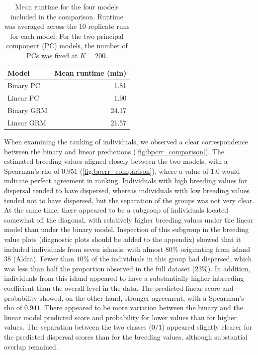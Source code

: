 
\begin{table}[htbp]
  \centering
  \caption{Mean runtime for the four models included in the comparison. Runtime was averaged across the 10
  replicate runs for each model. For the two principal component (PC) models, the number of PCs was fixed at \(K = 200\).}
  \label{tab:runtime_dropisland61}
  \begin{tabular}{lr}
  \hline
  Model & Mean runtime (min) \\
  \hline
  Binary PC & 1.81 \\
  Linear PC & 1.90 \\
  Binary GRM & 24.17 \\
  Linear GRM & 21.57 \\
  \hline
  \end{tabular}
  \end{table}


When examining the ranking of individuals, we observed a clear correspondence between the binary and linear predictions (\autoref{fig:bpcrr_comparison}). The estimated breeding values aligned closely between the two models, with a Spearman's rho of $0.951$ (\autoref{fig:bpcrr_comparison}), where a value of $1.0$ would indicate perfect agreement in ranking. 
Individuals with high breeding values for dispersal tended to have dispersed, whereas individuals with low breeding values tended not to have dispersed, but the separation of the groups was not very clear.  
At the same time, there appeared to be a subgroup of individuals located somewhat off the diagonal, with relatively higher breeding values under the linear model than under the binary model.
%
Inspection of this subgroup in the breeding value plots (diagnostic plots should be added to the appendix) showed that it included individuals from seven islands, with almost $80\%$ originating from island 38 (Aldra). Fewer than $10\%$ of the individuals in this group had dispersed, which was less than half the proportion observed in the full dataset ($23\%$). In addition, individuals from this island appeared to have a substantially higher inbreeding coefficient than the overall level in the data.
%
The predicted linear score and probability showed, on the other hand, stronger agreement, with a Spearman's rho of $0.941$. There appeared to be more variation between the binary and the linear model predicted score and probability for lower values than for higher values. 
The separation between the two classes ($0/1$) appeared slightly clearer for the predicted dispersal scores than for the breeding values, although substantial overlap remained.


